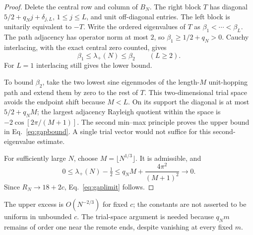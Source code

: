 \documentclass[11pt,a4paper]{article}
\begin{document}
\begin{proof}
Delete the central row and column of $B_N$. The right block $T$ has
diagonal $5/2+q_N j+\delta_{j,L}$, $1\le j\le L$, and unit
off-diagonal entries. The left block is unitarily equivalent to $-T$.
Write the ordered eigenvalues of $T$ as $\beta_1<\cdots<\beta_L$.
The path adjacency has operator norm at most $2$, so
$\beta_1\ge1/2+q_N>0$. Cauchy interlacing, with the exact central
zero counted, gives
\begin{equation}
 \beta_1\le\lambda_+(N)\le\beta_2\qquad(L\ge2).
 \label{eq:interlacing}
\end{equation}
For $L=1$ interlacing still gives the lower bound.

To bound $\beta_2$, take the two lowest sine eigenmodes of the
length-$M$ unit-hopping path and extend them by zero to the rest of
$T$. This two-dimensional trial space avoids the endpoint shift
because $M<L$. On its support the diagonal is at most $5/2+q_NM$;
the largest adjacency Rayleigh quotient within the space is
$-2\cos[2\pi/(M+1)]$. The second min--max principle proves the
upper bound in Eq.~\eqref{eq:gapbound}. A single trial vector would
not suffice for this second-eigenvalue estimate.

For sufficiently large $N$, choose $M=\lfloor N^{1/3}\rfloor$.
It is admissible, and
\begin{equation}
 0\le\lambda_+(N)-\tfrac12
 \le q_NM+\frac{4\pi^2}{(M+1)^2}\longrightarrow0.
 \label{eq:edgeconvergence}
\end{equation}
Since $R_N\to18+2c$, Eq.~\eqref{eq:gaplimit} follows.
\end{proof}

The upper excess is $O(N^{-2/3})$ for fixed $c$; the constants are
not asserted to be uniform in unbounded $c$. The trial-space argument
is needed because $q_Nm$ remains of order one near the remote ends,
despite vanishing at every fixed $m$.
\end{document}
